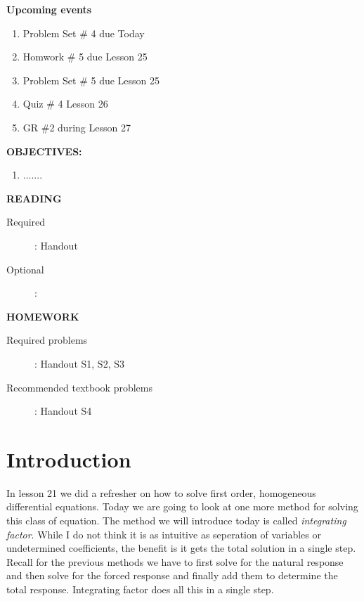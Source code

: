 \documentclass{handout}
\begin{document}
\maketitle

\textbf{Upcoming events}
\begin{enumerate}
\item Problem Set \# 4 due Today
\item Homwork \# 5 due Lesson 25
\item Problem Set \# 5 due Lesson 25
\item Quiz \# 4 Lesson 26
\item GR \#2 during Lesson 27
\end{enumerate}

\textbf{OBJECTIVES:}
\begin{enumerate}
\item .......
\end{enumerate}

\textbf{READING}
\begin{description}
\item [Required]:
Handout

\item [Optional]: 
\end{description}

\textbf{HOMEWORK}
\begin{description}
\item [Required problems]: Handout S1, S2, S3
\item [Recommended textbook problems]: Handout S4
\end{description}

\section{Introduction}
In lesson 21 we did a refresher on how to solve first order, homogeneous differential equations.  Today we are going to look at one more method for solving this class of equation.  The method we will introduce today is called {\em integrating factor}.  While I do not think it is as intuitive as seperation of variables or undetermined coefficients, the benefit is it gets the total solution in a single step.  Recall for the previous methods we have to first solve for the natural response and then solve for the forced response and finally add them to determine the total response.  Integrating factor does all this in a single step.
\end{document}
